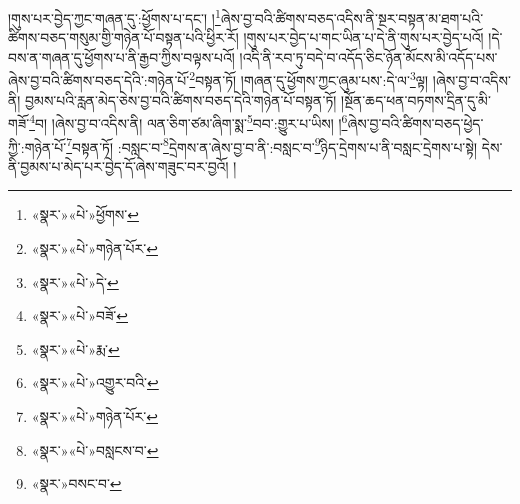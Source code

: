 །གུས་པར་བྱེད་ཀྱང་གཞན་དུ་:ཕྱོགས་པ་དང་། །\footnote{«སྣར་»«པེ་»ཕྱོགས་}ཞེས་བྱ་བའི་ཚིགས་བཅད་འདིས་ནི་སྔར་བསྟན་མ་ཐག་པའི་ཚིགས་བཅད་གསུམ་གྱི་གཉེན་པོ་བསྟན་པའི་ཕྱིར་རོ། །གུས་པར་བྱེད་པ་གང་ཡིན་པ་དེ་ནི་གུས་པར་བྱེད་པའོ། །དེ་བས་ན་གཞན་དུ་ཕྱོགས་པ་ནི་རྒྱབ་ཀྱིས་བལྟས་པའོ། །འདི་ནི་རབ་ཏུ་བདེ་བ་འདོད་ཅིང་ཉོན་མོངས་མི་འདོད་པས་ཞེས་བྱ་བའི་ཚིགས་བཅད་དེའི་:གཉེན་པོ་\footnote{«སྣར་»«པེ་»གཉེན་པོར་}བསྟན་ཏོ། །གཞན་དུ་ཕྱོགས་ཀྱང་ཞུམ་པས་:དེ་ལ་\footnote{«སྣར་»«པེ་»དེ་}ལྟ། །ཞེས་བྱ་བ་འདིས་ནི། བྱམས་པའི་རླན་མེད་ཅེས་བྱ་བའི་ཚིགས་བཅད་དེའི་གཉེན་པོ་བསྟན་ཏོ། །སྔོན་ཆད་ཕན་བཏགས་དྲིན་དུ་མི་གཟོ་\footnote{«སྣར་»«པེ་»བཟོ་}བ། །ཞེས་བྱ་བ་འདིས་ནི། ལན་ཅིག་ཙམ་ཞིག་སྨ་\footnote{«སྣར་»«པེ་»རྨ་}བབ་:གྱུར་པ་ཡིས། །\footnote{«སྣར་»«པེ་»འགྱུར་བའི་}ཞེས་བྱ་བའི་ཚིགས་བཅད་ཕྱེད་ཀྱི་:གཉེན་པོ་\footnote{«སྣར་»«པེ་»གཉེན་པོར་}བསྟན་ཏོ། :བསླང་བ་\footnote{«སྣར་»«པེ་»བསླངས་བ་}དྲེགས་ན་ཞེས་བྱ་བ་ནི་:བསླང་བ་\footnote{«སྣར་»བསང་བ་}ཉིད་དྲེགས་པ་ནི་བསླང་དྲེགས་པ་སྟེ། དེས་ནི་བྱམས་པ་མེད་པར་བྱེད་དོ་ཞེས་གཟུང་བར་བྱའོ། །
